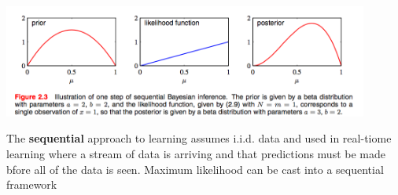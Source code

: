 \documentclass[11pt]{article}
\begin{document}
\begin{defn*}
    \begin{center}
        \includegraphics[width=12cm]{prior_to_posterior.jpg}
    \end{center}  
    The \textbf{sequential} approach to learning assumes i.i.d. data and used in real-tiome learning where a stream of data is arriving and that predictions must be made bfore all of the data is seen. Maximum likelihood can be cast into a sequential framework
\end{defn*}

\end{document}
